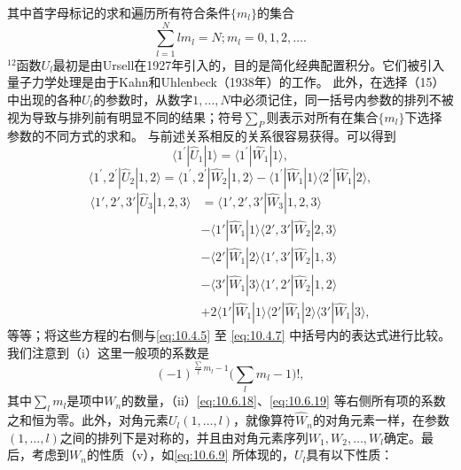 其中首字母标记的求和遍历所有符合条件\(\{m_l\}\)的集合
\begin{equation}\tag{10.6.16}\label{eq:10.6.16}
\sum _ { l = 1 } ^{N} l m _ { l } = N ;  m _ { l } = 0 , 1 , 2 , \ldots .
\end{equation}
\(^{12}\)函数\(U_{l}\)最初是由Ursell在1927年引入的，目的是简化经典配置积分。它们被引入量子力学处理是由于Kahn和Uhlenbeck（1938年）的工作。
此外，在选择（15）中出现的各种\(U_l\)的参数时，从数字\(1,\ldots,N\)中必须记住，同一括号内参数的排列不被视为导致与排列前有明显不同的结果；符号\(\sum_P\)则表示对所有在集合\(\{m_l\}\)下选择参数的不同方式的求和。
与前述关系相反的关系很容易获得。可以得到
\begin{equation}\tag{10.6.17}\label{eq:10.6.17}
\langle 1 ^{\prime} | \hat { U } _ { 1 } | 1 \rangle = \langle 1 ^{\prime} | \hat { W } _ { 1 } | 1 \rangle ,
\end{equation}
\begin{equation}\tag{10.6.18}\label{eq:10.6.18}
\langle 1 ^{\prime} , 2 ^{\prime} | \hat { U } _ { 2 } | 1 , 2 \rangle = \langle 1 ^{\prime} , 2 ^{\prime} | \hat { W } _ { 2 } | 1 , 2 \rangle - \langle 1 ^{\prime} | \hat { W } _ { 1 } | 1 \rangle \langle 2 ^{\prime} | \hat { W } _ { 1 } | 2 \rangle ,
\end{equation}
\begin{equation}\tag{10.6.19}\label{eq:10.6.19}
\begin{aligned}\langle1',2',3'|\hat{U}_3|1,2,3\rangle&=\langle1',2',3'|\hat{W}_3|1,2,3\rangle\\&-\langle1'|\hat{W}_1|1\rangle\langle2',3'|\hat{W}_2|2,3\rangle\\&-\langle2'|\hat{W}_1|2\rangle\langle1',3'|\hat{W}_2|1,3\rangle\\&-\langle3'|\hat{W}_1|3\rangle\langle1',2'|\hat{W}_2|1,2\rangle\\&+2\langle1'|\hat{W}_1|1\rangle\langle2'|\hat{W}_1|2\rangle\langle3'|\hat{W}_1|3\rangle,\end{aligned}
\end{equation}
等等；将这些方程的右侧与\autoref{eq:10.4.5} 至 \autoref{eq:10.4.7} 中括号内的表达式进行比较。我们注意到（i）这里一般项的系数是
\begin{equation}\tag{10.6.20}\label{eq:10.6.20}
( - 1 ) ^{\frac { \sum} { l } m _ { l } - 1 } \Big ( \sum _ { l } m _ { l } - 1 \Big ) ! ,
\end{equation}
其中\(\sum_{l} m_{l}\)是项中\(W_{n}\)的数量，（ii）\autoref{eq:10.6.18}、\autoref{eq:10.6.19} 等右侧所有项的系数之和恒为零。此外，对角元素\(U_{l}(1, \ldots, l)\)，就像算符\(\hat{W}_{n}\)的对角元素一样，在参数\((1, \ldots, l)\)之间的排列下是对称的，并且由对角元素序列\(W_{1}, W_{2}, \ldots, W_{l}\)确定。最后，考虑到\(W_{n}\)的性质（v），如\autoref{eq:10.6.9} 所体现的，\(U_{l}\)具有以下性质：
